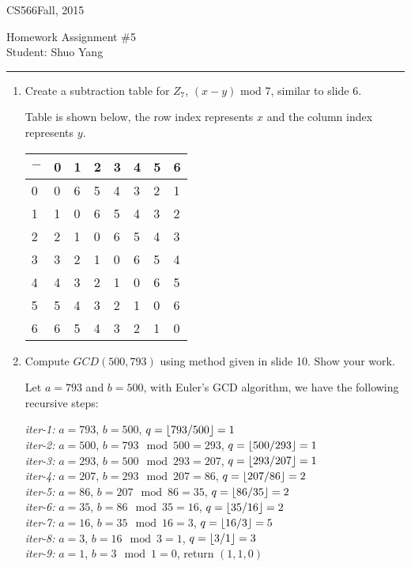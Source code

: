 \documentclass[11pt]{article}
\DeclarePairedDelimiter\floor{\lfloor}{\rfloor}
\def\CourseCode{CS566}
\def\AssignmentNo{5}
\def\DateHandedOut{Fall, 2015}
\def\Author{Shuo Yang}
\begin{document}
\noindent

\CourseCode \hfill \DateHandedOut

\begin{center}
Homework Assignment \#\AssignmentNo\\
Student: \Author\\
\end{center}

\hrule\smallskip

\begin{enumerate}

\item %
  Create a subtraction table for $Z_7$, $(x-y)$ mod 7, similar to
  slide 6.

Table is shown below, the row index represents $x$ and the column
index represents $y$.

\begin{tabular}{ l | l | l | l | l | l | l | l }
  $-$ & 0 & 1 & 2 & 3 & 4 & 5 & 6 \\ \hline
  0 & 0 & 6 & 5 & 4 & 3 & 2 & 1 \\ \hline
  1 & 1 & 0 & 6 & 5 & 4 & 3 & 2 \\ \hline
  2 & 2 & 1 & 0 & 6 & 5 & 4 & 3 \\ \hline
  3 & 3 & 2 & 1 & 0 & 6 & 5 & 4 \\ \hline
  4 & 4 & 3 & 2 & 1 & 0 & 6 & 5 \\ \hline
  5 & 5 & 4 & 3 & 2 & 1 & 0 & 6 \\ \hline
  6 & 6 & 5 & 4 & 3 & 2 & 1 & 0 \\
\end{tabular}

\item Compute $GCD(500, 793)$ using method given in slide 10. Show
  your work.

Let $a=793$ and $b=500$, with Euler's GCD algorithm, we have the
following recursive steps:

\emph{iter-1:} $a=793$, $b=500$, $q=\floor{793/500}=1$\\
\emph{iter-2:} $a=500$, $b=793 \mod 500 = 293$, $q=\floor{500/293}=1$\\
\emph{iter-3:} $a=293$, $b=500 \mod 293 = 207$, $q=\floor{293/207}=1$\\
\emph{iter-4:} $a=207$, $b=293 \mod 207 = 86$, $q=\floor{207/86}=2$\\
\emph{iter-5:} $a=86$, $b=207 \mod 86 = 35$, $q=\floor{86/35}=2$\\
\emph{iter-6:} $a=35$, $b=86 \mod 35 = 16$, $q=\floor{35/16}=2$\\
\emph{iter-7:} $a=16$, $b=35 \mod 16 = 3$, $q=\floor{16/3}=5$\\
\emph{iter-8:} $a=3$, $b=16 \mod 3 = 1$, $q=\floor{3/1}=3$\\
\emph{iter-9:} $a=1$, $b=3 \mod 1 = 0$, return $(1, 1, 0)$\\


\end{enumerate}
\end{document}
